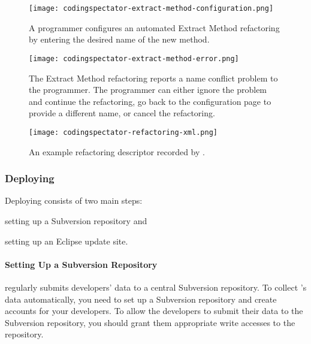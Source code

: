 \begin{figure}
%
\centering
%
\texttt{[image: codingspectator-extract-method-configuration.png]}
%
\caption{\label{FigCodingSpectatorExtractMethodConfigurationExample}A programmer
configures an automated Extract Method refactoring by entering the desired name
of the new method.}
%
\end{figure}

\begin{figure}
%
\centering
%
\texttt{[image: codingspectator-extract-method-error.png]}
%
\caption{\label{FigCodingSpectatorExtractMethodErrorExample}The Extract Method
refactoring reports a name conflict problem to the programmer. The programmer
can either ignore the problem and continue the refactoring, go back to the
configuration page to provide a different name, or cancel the refactoring.}
%
\end{figure}

\begin{figure}
%
\centering
%
\texttt{[image: codingspectator-refactoring-xml.png]}
%
\caption{\label{FigCodingSpectatorDescriptorExample}An example refactoring
descriptor recorded by \CodingSpectator.}
%
\end{figure}

\subsubsection{Deploying \CodingSpectator}

Deploying \CodingSpectator{} consists of two main steps:
%
\begin{inparaenum}[(1)]
%
\item setting up a Subversion repository and
%
\item setting up an Eclipse update site.
%
\end{inparaenum}

\paragraph{Setting Up a Subversion Repository}

\CodingSpectator{} regularly submits developers' data to a central Subversion
repository. To collect \CodingSpectator's data automatically, you need to set up
a Subversion repository and create accounts for your developers. To allow the developers
to submit their data to the Subversion repository, you should grant them
appropriate write accesses to the repository.

